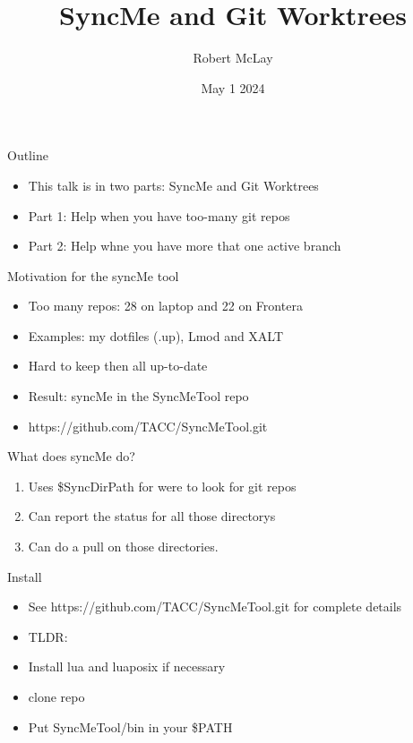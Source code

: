 \documentclass{beamer}
\begin{document}
\title[SyncMe]{SyncMe and Git Worktrees}
\author{Robert McLay} 
\date{May 1 2024}

\frame{\titlepage} 


\begin{frame}{Outline}
  \begin{itemize}
    \item This talk is in two parts: SyncMe and Git Worktrees
    \item Part 1: Help when you have too-many git repos
    \item Part 2: Help whne you have more that one active branch
  \end{itemize}
\end{frame}

\begin{frame}{Motivation for the syncMe tool }
  \begin{itemize}
    \item Too many repos: 28 on laptop and 22 on Frontera
    \item Examples: my dotfiles (.up), Lmod and XALT
    \item Hard to keep then all up-to-date
    \item Result: syncMe in the SyncMeTool repo
    \item https://github.com/TACC/SyncMeTool.git
  \end{itemize}
\end{frame}

\begin{frame}{What does syncMe do?}
  \begin{enumerate}
    \item Uses \$SyncDirPath for were to look for git repos
    \item Can report the status for all those directorys
    \item Can do a pull on those directories.
  \end{enumerate}
\end{frame}

\begin{frame}{Install}
  \begin{itemize}
    \item See https://github.com/TACC/SyncMeTool.git for complete details
    \item TLDR:
    \item Install lua and luaposix if necessary
    \item clone repo
    \item Put SyncMeTool/bin in your \$PATH
  \end{itemize}
\end{frame}
\end{document}
